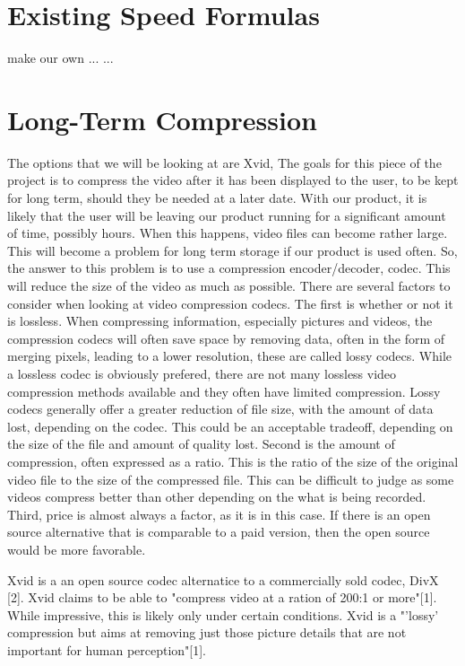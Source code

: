 \documentclass[letterpaper,10pt,onecolumn,draftclsnofoot]{IEEEtran}
\begin{document}
\section{Existing Speed Formulas} %

make our own
...
...

\section{Long-Term Compression} %

The options that we will be looking at are Xvid, 
The goals for this piece of the project is to compress the video after it has been displayed to the user, to be kept for long term, should they be needed at a later date.
With our product, it is likely that the user will be leaving our product running for a significant amount of time, possibly hours.
When this happens, video files can become rather large.
This will become a problem for long term storage if our product is used often.
So, the answer to this problem is to use a compression encoder/decoder, codec.
This will reduce the size of the video as much as possible.
There are several factors to consider when looking at video compression codecs.
The first is whether or not it is lossless.
When compressing information, especially pictures and videos, the compression codecs will often save space by removing data, often in the form of merging pixels, leading to a lower resolution, these are called lossy codecs.
While a lossless codec is obviously prefered, there are not many lossless video compression methods available and they often have limited compression.
Lossy codecs generally offer a greater reduction of file size, with the amount of data lost, depending on the codec.
This could be an acceptable tradeoff, depending on the size of the file and amount of quality lost.
Second is the amount of compression, often expressed as a ratio.
This is the ratio of the size of the original video file to the size of the compressed file.
This can be difficult to judge as some videos compress better than other depending on the what is being recorded.
Third, price is almost always a factor, as it is in this case.
If there is an open source alternative that is comparable to a paid version, then the open source would be more favorable.

Xvid is a an open source codec alternatice to a commercially sold codec, DivX [2].
Xvid claims to be able to "compress video at a ration of 200:1 or more"[1].
While impressive, this is likely only under certain conditions.
Xvid is a "'lossy' compression but aims at removing just those picture details that are not important for human perception"[1].




\end{document}

